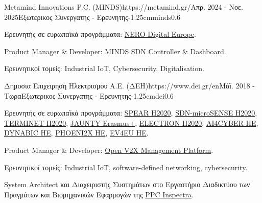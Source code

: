 \documentclass{mycv}
\begin{document}
	\vspace*{0.5cm}

	\begin{EntryDatedLogo}{Metamind Innovations P.C. (MINDS)}{https://metamind.gr/}{Απρ. 2024 - Νοε. 2025}{Εξωτερικος Συνεργατης - Ερευνητης}{-1.25cm}{minds}{0.6}
		\begin{Itemize}
			\item Ερευνητής σε ευρωπαϊκά προγράμματα: \href{https://metamind.gr/project/nero/}{NERO Digital Europe}.
			\item Product Manager \& Developer: MINDS SDN Controller \& Dashboard.
			\item Ερευνητικοί τομείς: Industrial IoT, Cybersecurity, Digitalisation.
		\end{Itemize}
	\end{EntryDatedLogo}

	\vspace*{0.5cm}

	\begin{EntryDatedLogo}{Δημοσια Επιχειρηση Ηλεκτρισμου Α.Ε. (ΔΕΗ)}{https://www.dei.gr/en}{Μάϊ. 2018 - Τωρα}{Εξωτερικος Συνεργατης - Ερευνητης}{-1.25cm}{dei}{0.6}
	\begin{Itemize}
		\item Ερευνητής σε ευρωπαϊκά προγράμματα: \href{https://cordis.europa.eu/project/id/787011}{SPEAR H2020}, \href{https://cordis.europa.eu/project/id/833955}{SDN-microSENSE H2020}, \href{https://cordis.europa.eu/project/id/957406}{TERMINET H2020}, \href{https://www.jaunty.eu/}{JAUNTY Erasmus+}, \href{https://cordis.europa.eu/project/id/101021936}{ELECTRON H2020}, \href{https://cordis.europa.eu/project/id/101070450}{AI4CYBER HE}, \href{https://cordis.europa.eu/project/id/101070455}{DYNABIC HE}, \href{https://cordis.europa.eu/project/id/101070586}{PHOENI2X HE}, \href{https://cordis.europa.eu/project/id/101056765}{EV4EU HE}.
		\item Product Manager \& Developer: \href{https://github.com/EV4EU/ov2xmp}{Open V2X Management Platform}. 
		\item Ερευνητικοί τομείς: Industrial IoT, software-defined networking, cybersecurity.
		\item System Architect και Διαχειριστής Συστημάτων στο Εργαστήριο Διαδικτύου των Πραγμάτων και Βιομηχανικών Εφαρμογών της \href{https://www.ppcgroup.com/en/ppc-inspectra/}{PPC Inspectra}.
	\end{Itemize}
	\end{EntryDatedLogo}

	\vspace*{0.5cm}
\end{document}
